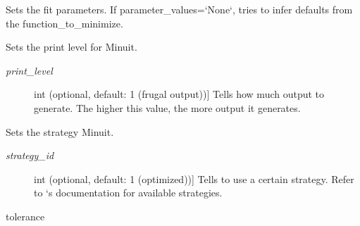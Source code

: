 \documentclass[a4paper,10pt,english]{sphinxmanual}
\begin{document}
\begin{fulllineitems}
\begin{fulllineitems}
\end{fulllineitems}


\begin{fulllineitems}
\label{index:kafe.minuit.Minuit.set_parameter_values}
Sets the fit parameters. If parameter\_values={}`None{}`, tries to infer
defaults from the function\_to\_minimize.

\end{fulllineitems}


\begin{fulllineitems}
\label{index:kafe.minuit.Minuit.set_print_level}
Sets the print level for Minuit.
\begin{description}
\item[{\emph{print\_level}}] \leavevmode{[}int (optional, default: 1 (frugal output)){]}
Tells  how much output to generate. The higher this
value, the more output it generates.

\end{description}

\end{fulllineitems}


\begin{fulllineitems}
\label{index:kafe.minuit.Minuit.set_strategy}
Sets the strategy Minuit.
\begin{description}
\item[{\emph{strategy\_id}}] \leavevmode{[}int (optional, default: 1 (optimized)){]}
Tells  to use a certain strategy. Refer to `s
documentation for available strategies.

\end{description}

\end{fulllineitems}


\begin{fulllineitems}
\label{index:kafe.minuit.Minuit.tolerance}
 tolerance


\end{fulllineitems}
\end{fulllineitems}
\end{document}
